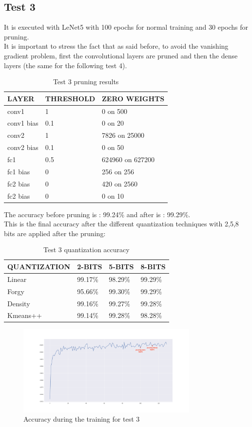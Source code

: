 \documentclass[journal]{vgtc}                %
\begin{document}
\subsection{Test 3}
It is executed with LeNet5 with 100 epochs for normal training and 30 epochs for pruning.\\It is important to stress the fact that as said before, to avoid the vanishing gradient problem, first the convolutional layers are pruned and then the dense layers (the same for the following test 4).
\begin{table}[H]
\caption{Test 3 pruning results}
\label{my-label}
\begin{tabular}{|l|l|l|}
\hline
LAYER    & THRESHOLD & ZERO WEIGHTS     \\ \hline
conv1      & 1         & 0 on 500 \\ \hline
conv1 bias & 0.1       & 0 on 20        \\ \hline
conv2      & 1         & 7826 on 25000   \\ \hline
conv2 bias & 0.1       & 0 on 50       \\ \hline
fc1      & 0.5       & 624960 on 627200      \\ \hline
fc1 bias & 0         & 256 on 256          \\ \hline
fc2 bias & 0         & 420 on 2560          \\ \hline
fc2 bias & 0         & 0 on 10          \\ \hline

\end{tabular}
\end{table}

The accuracy before pruning is : 99.24\% and after is : 99.29\%.\\This is the final accuracy after the different quantization techniques with 2,5,8 bits are applied after the pruning:
\begin{table}[H]
\caption{Test 3 quantization accuracy}
\label{my-label}
\begin{tabular}{|l|l|l|l|}
\hline
QUANTIZATION & 2-BITS  & 5-BITS  & 8-BITS  \\ \hline
Linear       & 99.17\% & 98.29\% & 99.29\% \\ \hline
Forgy        & 95.66\% & 99.30\% & 99.29\% \\ \hline
Density       & 99.16\% & 99.27\% & 99.28\% \\ \hline
Kmeans++     & 99.14\% & 99.28\% & 98.28\% \\ \hline
\end{tabular}
\end{table}\begin{figure}[H]
	\includegraphics[width=90mm,scale=0.7]{accuracy-soft-threshold-conv}
	\caption{Accuracy during the training for test 3}
\end{figure}
\end{document}
